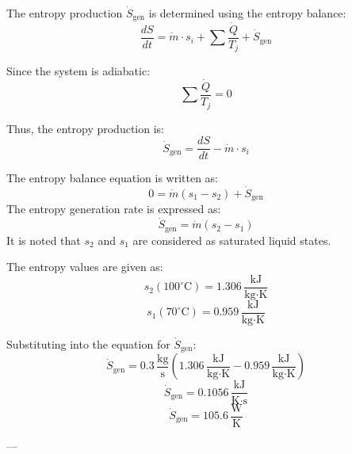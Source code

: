 The entropy production \( \dot{S}_{\text{gen}} \) is determined using the entropy balance:  
\[
\frac{dS}{dt} = \dot{m} \cdot s_i + \sum \frac{\dot{Q}}{T_j} + \dot{S}_{\text{gen}}
\]  

Since the system is adiabatic:  
\[
\sum \frac{\dot{Q}}{T_j} = 0
\]  

Thus, the entropy production is:  
\[
\dot{S}_{\text{gen}} = \frac{dS}{dt} - \dot{m} \cdot s_i
\]

The entropy balance equation is written as:  
\[
0 = \dot{m}(s_1 - s_2) + \dot{S}_{\text{gen}}
\]  
The entropy generation rate is expressed as:  
\[
\dot{S}_{\text{gen}} = \dot{m}(s_2 - s_1)
\]  
It is noted that \( s_2 \) and \( s_1 \) are considered as saturated liquid states.  

The entropy values are given as:  
\[
s_2 (100^\circ\text{C}) = 1.306 \, \frac{\text{kJ}}{\text{kg·K}}
\]  
\[
s_1 (70^\circ\text{C}) = 0.959 \, \frac{\text{kJ}}{\text{kg·K}}
\]  

Substituting into the equation for \( \dot{S}_{\text{gen}} \):  
\[
\dot{S}_{\text{gen}} = 0.3 \, \frac{\text{kg}}{\text{s}} \left( 1.306 \, \frac{\text{kJ}}{\text{kg·K}} - 0.959 \, \frac{\text{kJ}}{\text{kg·K}} \right)
\]  
\[
\dot{S}_{\text{gen}} = 0.1056 \, \frac{\text{kJ}}{\text{K·s}}
\]  
\[
\dot{S}_{\text{gen}} = 105.6 \, \frac{\text{W}}{\text{K}}
\]  

---